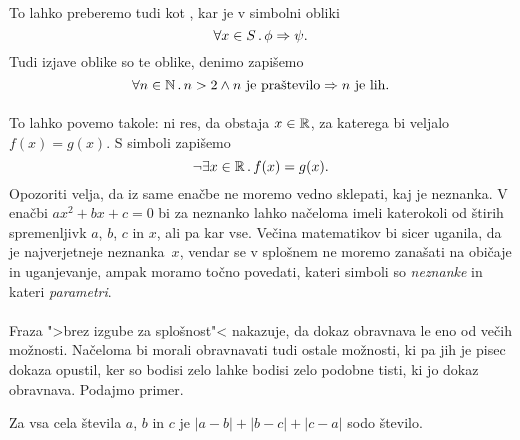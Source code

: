 \paragraph{}
%
To lahko preberemo tudi kot , kar je v simbolni obliki
%
\begin{equation*}
  \forall x \in S \,.\, \phi \Rightarrow \psi.
\end{equation*}
%
Tudi izjave oblike  so te oblike, denimo  zapišemo
%
\begin{equation*}
  \forall n \in \mathbb{N} \,.\, n > 2 \land \text{$n$ je praštevilo} \Rightarrow \text{$n$ je lih}.
\end{equation*}

\paragraph{}
%
To lahko povemo takole: ni res, da obstaja $x \in \mathbb{R}$, za katerega bi
veljalo $f(x) = g(x)$. S simboli zapišemo
%
\begin{equation*}
  \lnot \exists x \in \mathbb{R} \,.\, f(x) = g(x).
\end{equation*}
%
Opozoriti velja, da iz same enačbe ne moremo vedno sklepati, kaj je
neznanka. V enačbi $a x^2 + b x + c = 0$ bi za neznanko lahko načeloma
imeli katerokoli od štirih spremenljivk $a$, $b$, $c$ in $x$, ali pa
kar vse. Večina matematikov bi sicer uganila, da je najverjetneje
neznanka~$x$, vendar se v splošnem ne moremo zanašati na običaje in
uganjevanje, ampak moramo točno povedati, kateri simboli so
\emph{neznanke} in kateri \emph{parametri}.


\paragraph{}
%
Fraza ">brez izgube za splošnost"< nakazuje, da dokaz obravnava le eno
od večih možnosti. Načeloma bi morali obravnavati tudi ostale
možnosti, ki pa jih je pisec dokaza opustil, ker so bodisi zelo lahke
bodisi zelo podobne tisti, ki jo dokaz obravnava. Podajmo primer.

\begin{trditev}
  \label{izrek:abc-vsota-razlik-soda}
  Za vsa cela števila $a$, $b$ in $c$ je $|a-b|+|b-c|+|c-a|$ sodo število.
\end{trditev}

